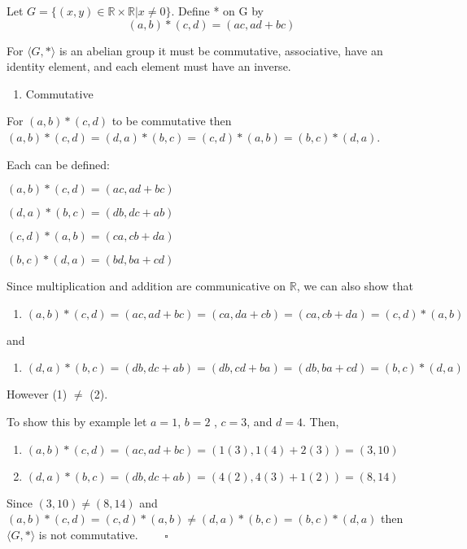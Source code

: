 \documentclass[
]{article}
\providecommand{\tightlist}{%
  \setlength{\itemsep}{0pt}\setlength{\parskip}{0pt}}
\begin{document}
Let \(G=\{(x,y)\in\mathbb{R}\times\mathbb{R}|x\ne0\}\). Define * on G by
\[(a,b)*(c,d)=(ac,ad+bc)\]

For \(\langle G,*\rangle\) is an abelian group it must be commutative,
associative, have an identity element, and each element must have an
inverse.

\begin{enumerate}
\def\labelenumi{(\roman{enumi})}
\tightlist
\item
  Commutative
\end{enumerate}

For \((a,b)*(c,d)\) to be commutative then
\((a,b)*(c,d)=(d,a)*(b,c)=(c,d)*(a,b)=(b,c)*(d,a)\).

Each can be defined:

\((a,b)*(c,d)=(ac,ad+bc)\)

\((d,a)*(b,c)=(db,dc+ab)\)

\((c,d)*(a,b)=(ca,cb+da)\)

\((b,c)*(d,a)=(bd,ba+cd)\)

Since multiplication and addition are communicative on \(\mathbb{R}\),
we can also show that

\begin{enumerate}
\def\labelenumi{(\arabic{enumi})}
\tightlist
\item
  \((a,b)*(c,d)=(ac,ad+bc)=(ca,da+cb)=(ca,cb+da)=(c,d)*(a,b)\)
\end{enumerate}

and

\begin{enumerate}
\def\labelenumi{(\arabic{enumi})}
\setcounter{enumi}{1}
\tightlist
\item
  \((d,a)*(b,c)=(db,dc+ab)=(db,cd+ba)=(db,ba+cd)=(b,c)*(d,a)\)
\end{enumerate}

However (1) \(\ne\) (2).

To show this by example let \(a=1\), \(b=2\) , \(c=3\), and \(d=4\).
Then,

\begin{enumerate}
\def\labelenumi{(\arabic{enumi})}
\item
  \((a,b)*(c,d)=(ac,ad+bc)=(1(3),1(4)+2(3))=(3,10)\)
\item
  \((d,a)*(b,c)=(db,dc+ab)=(4(2),4(3)+1(2))=(8,14)\)
\end{enumerate}

Since \((3,10)\ne (8,14)\) and
\((a,b)*(c,d)=(c,d)*(a,b)\ne (d,a)*(b,c)=(b,c)*(d,a)\) then
\(\langle G,*\rangle\) is not commutative. \(\quad\quad\square\)
\end{document}
